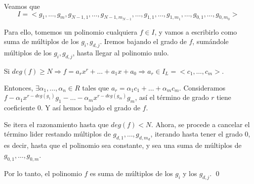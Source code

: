 \documentclass{article}
\begin{document}
Veamos que
$$I=<g_1,\dots , g_m, g_{N-1,1},\dots , g_{N-1,m_{N-1}},\dots, g_{1,1},\dots , g_{1,m_1},\dots , g_{0,1},\dots , g_{0,m_0}>$$

Para ello, tomemos un polinomio cualquiera $f\in I$, y vamos a escribirlo como suma de múltiplos de los $g_i,g_{d,j}$. Iremos bajando el grado de $f$, sumándole múltiplos de los $g_i,g_{d,j}$, hasta llegar al polinomio nulo.

Si $deg(f)\ge N \Rightarrow f=a_rx^r+\dots + a_1x+a_0 \Rightarrow a_r\in I_L=<c_1,\dots, c_m>$.

Entonces, $\exists \alpha_1,\dots, \alpha_n\in R$ tales que $a_r=\alpha_1 c_1+\dots + \alpha_m c_m$. Consideramos $f-\alpha_1 x^{r-deg(g_1)}g_1-\dots - \alpha_m x^{r-deg(g_m)}g_m$, así el término de grado $r$ tiene coeficiente $0$. Y así hemos bajado el grado de $f$.

Se itera el razonamiento hasta que $deg(f)<N$. Ahora, se procede a cancelar el término lider restando múltiplos de $g_{d,1},\dots, g_{d,m_d}$, iterando hasta tener el grado $0$, es decir, hasta que el polinomio sea constante, y sea una suma de múltiplos de$g_{0,1},\dots, g_{0,m}$.

Por lo tanto, el polinomio $f$ es suma de múltiplos de los $g_i$ y los $g_{d,j}$. 
\qed
\end{document}
